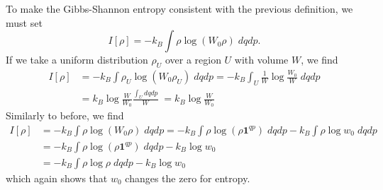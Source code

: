 To make the Gibbs-Shannon entropy consistent with the previous definition, we must set
\begin{equation}
	I[\rho] = - k_B \int \rho \log ( W_0 \rho ) \; dq dp.
\end{equation}
If we take a uniform distribution $\rho_U$ over a region $U$ with volume $W$, we find
\begin{equation}
	\begin{aligned}
		I[\rho] &= - k_B \int \rho_U \log ( W_0 \rho_U ) \; dq dp = - k_B \int_{U} \frac{1}{W} \log \frac{W_0}{W} \; dq dp \\
		&= k_B \log \frac{W}{W_0} \frac{ \int_{U} dq dp}{W} \;  = k_B \log \frac{W}{W_0}
	\end{aligned}
\end{equation}
Similarly to before, we find
\begin{equation}
	\begin{aligned}
	I[\rho] &= - k_B \int \rho \log (W_0 \rho) \; dq dp = - k_B \int \rho \log (\rho \textbf{1}^{qp}) \; dq dp - k_B \int \rho \log w_0 \; dq dp \\
	&= - k_B \int \rho \log (\rho \textbf{1}^{qp}) \; dq dp - k_B \log w_0 \\
	&= - k_B \int \rho \log \rho \; dq dp - k_B \log w_0
	\end{aligned}
\end{equation}
which again shows that $w_0$ changes the zero for entropy.


